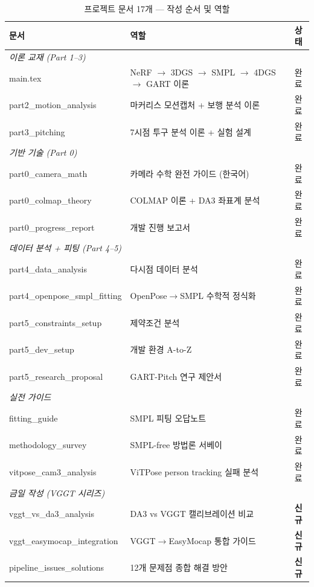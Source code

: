 \documentclass[11pt, a4paper]{report}
\begin{document}
\begin{table}[H]
\centering
\caption{프로젝트 문서 17개 --- 작성 순서 및 역할}
\renewcommand{\arraystretch}{1.3}
\small
\begin{tabular}{l p{8cm} c}
\toprule
\textbf{문서} & \textbf{역할} & \textbf{상태} \\
\midrule
\multicolumn{3}{l}{\textit{이론 교재 (Part 1--3)}} \\
main.tex & NeRF $\rightarrow$ 3DGS $\rightarrow$ SMPL $\rightarrow$ 4DGS $\rightarrow$ GART 이론 & 완료 \\
part2\_motion\_analysis & 마커리스 모션캡처 + 보행 분석 이론 & 완료 \\
part3\_pitching & 7시점 투구 분석 이론 + 실험 설계 & 완료 \\
\midrule
\multicolumn{3}{l}{\textit{기반 기술 (Part 0)}} \\
part0\_camera\_math & 카메라 수학 완전 가이드 (한국어) & 완료 \\
part0\_colmap\_theory & COLMAP 이론 + DA3 좌표계 분석 & 완료 \\
part0\_progress\_report & 개발 진행 보고서 & 완료 \\
\midrule
\multicolumn{3}{l}{\textit{데이터 분석 + 피팅 (Part 4--5)}} \\
part4\_data\_analysis & 다시점 데이터 분석 & 완료 \\
part4\_openpose\_smpl\_fitting & OpenPose$\rightarrow$SMPL 수학적 정식화 & 완료 \\
part5\_constraints\_setup & 제약조건 분석 & 완료 \\
part5\_dev\_setup & 개발 환경 A-to-Z & 완료 \\
part5\_research\_proposal & GART-Pitch 연구 제안서 & 완료 \\
\midrule
\multicolumn{3}{l}{\textit{실전 가이드}} \\
fitting\_guide & SMPL 피팅 오답노트 & 완료 \\
methodology\_survey & SMPL-free 방법론 서베이 & 완료 \\
vitpose\_cam3\_analysis & ViTPose person tracking 실패 분석 & 완료 \\
\midrule
\multicolumn{3}{l}{\textit{금일 작성 (VGGT 시리즈)}} \\
vggt\_vs\_da3\_analysis & DA3 vs VGGT 캘리브레이션 비교 & \textbf{신규} \\
vggt\_easymocap\_integration & VGGT$\rightarrow$EasyMocap 통합 가이드 & \textbf{신규} \\
pipeline\_issues\_solutions & 12개 문제점 종합 해결 방안 & \textbf{신규} \\
\bottomrule
\end{tabular}
\end{table}
\end{document}
